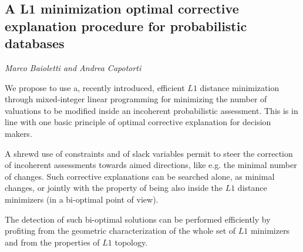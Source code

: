 \documentclass[../booklet.tex]{subfiles}
\begin{document}
\subsection[A  L1 minimization optimal corrective explanation procedure for probabilistic databases. {\it Marco Baioletti and Andrea Capotorti}]{A  L1 minimization optimal corrective explanation procedure for probabilistic databases}
 

\begin{center}
  {\it Marco Baioletti and Andrea Capotorti}
\end{center}



We propose to use a, recently introduced,  efficient $L1$ distance minimization through mixed-integer
linear programming for minimizing the number of valuations to be modified inside an incoherent probabilistic assessment. This is in line with one basic principle of optimal corrective explanation for decision makers.

 A shrewd use of constraints and of slack variables permit to steer the correction of incoherent assessments towards aimed directions, like e.g. the minimal number of changes. Such corrective explanations can be searched alone, as minimal changes, or jointly with the property of being also inside the $L1$ distance minimizers (in a bi-optimal point of view).
 
 The detection of such bi-optimal solutions can be performed efficiently by profiting from the geometric characterization of the whole set of $L1$ minimizers and from the properties of $L1$ topology.
 
\end{document}
